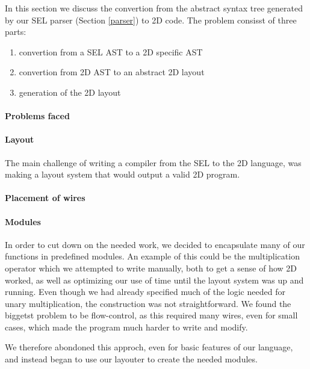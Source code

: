 In this section we discuss the convertion from the abstract syntax
tree generated by our SEL parser (Section \ref{parser}) to 2D code.
The problem consisst of three parts:
\begin{enumerate}
\item convertion from a SEL AST to a 2D specific AST
\item convertion from 2D AST to an abstract 2D layout
\item generation of the 2D layout
\end{enumerate}

\paragraph{Problems faced}
\label{compiler:problems}

\paragraph{Layout}
\label{compiler:layout}
The main challenge of writing a compiler from the SEL to the 2D
language, was making a layout system that would output a valid 2D program.

\paragraph{Placement of wires}
\label{compiler:placement}

\paragraph{Modules}
\label{compiler:modules}
In order to cut down on the needed work, we decided to encapsulate
many of our functions in predefined modules. An example of this could
be the multiplication operator which we attempted to write manually,
both to get a sense of how 2D worked, as well as optimizing our use of
time until the layout system was up and running. Even though we had
already specified much of the logic needed for unary multiplication,
the construction was not straightforward. We found the biggetst
problem to be flow-control, as this required many wires, even for
small cases, which made the program much harder to write and modify.

We therefore abondoned this approch, even for basic features of our
language, and instead began to use our layouter to create the needed
modules.

